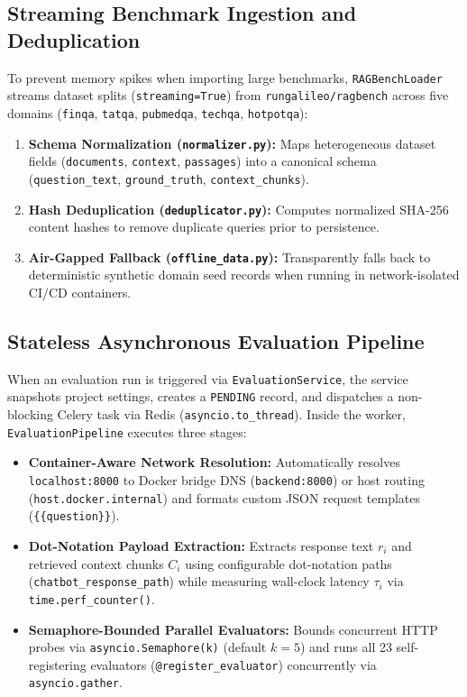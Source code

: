 \documentclass[conference]{IEEEtran}
\begin{document}
\subsection{Streaming Benchmark Ingestion and Deduplication}
To prevent memory spikes when importing large benchmarks, \texttt{RAGBenchLoader} streams dataset splits (\texttt{streaming=True}) from \texttt{rungalileo/ragbench} across five domains (\texttt{finqa}, \texttt{tatqa}, \texttt{pubmedqa}, \texttt{techqa}, \texttt{hotpotqa}):
\begin{enumerate}
    \item \textbf{Schema Normalization (\texttt{normalizer.py}):} Maps heterogeneous dataset fields (\texttt{documents}, \texttt{context}, \texttt{passages}) into a canonical schema (\texttt{question\_text}, \texttt{ground\_truth}, \texttt{context\_chunks}).
    \item \textbf{Hash Deduplication (\texttt{deduplicator.py}):} Computes normalized SHA-256 content hashes to remove duplicate queries prior to persistence.
    \item \textbf{Air-Gapped Fallback (\texttt{offline\_data.py}):} Transparently falls back to deterministic synthetic domain seed records when running in network-isolated CI/CD containers.
\end{enumerate}

\subsection{Stateless Asynchronous Evaluation Pipeline}
When an evaluation run is triggered via \texttt{EvaluationService}, the service snapshots project settings, creates a \texttt{PENDING} record, and dispatches a non-blocking Celery task via Redis (\texttt{asyncio.to\_thread}). Inside the worker, \texttt{EvaluationPipeline} executes three stages:
\begin{itemize}
    \item \textbf{Container-Aware Network Resolution:} Automatically resolves \texttt{localhost:8000} to Docker bridge DNS (\texttt{backend:8000}) or host routing (\texttt{host.docker.internal}) and formats custom JSON request templates (\texttt{\{\{question\}\}}).
    \item \textbf{Dot-Notation Payload Extraction:} Extracts response text $r_i$ and retrieved context chunks $C_i$ using configurable dot-notation paths (\texttt{chatbot\_response\_path}) while measuring wall-clock latency $\tau_i$ via \texttt{time.perf\_counter()}.
    \item \textbf{Semaphore-Bounded Parallel Evaluators:} Bounds concurrent HTTP probes via \texttt{asyncio.Semaphore(k)} (default $k=5$) and runs all 23 self-registering evaluators (\texttt{@register\_evaluator}) concurrently via \texttt{asyncio.gather}.
\end{itemize}
\end{document}
